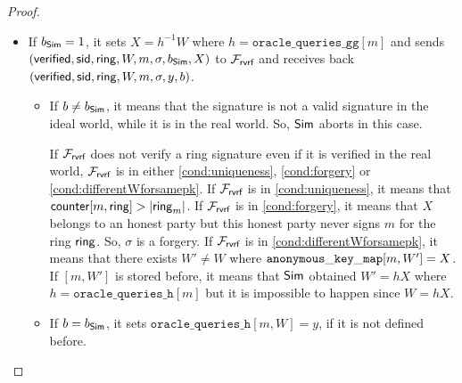 \begin{proof}
\begin{itemize}
		\begin{itemize}
			\item 		If $ b_{\mathsf{Sim}} = 1 $, it sets $ X = h^{-1} W$ where $ h = \mathtt{oracle\_queries\_gg}[m] $ and sends  $ (\mathsf{verified}, \textsf{sid}, \mathsf{ring}, W, m, \sigma, b_{\mathsf{Sim}}, X) $ to $ \mathcal{F}_{\textsf{rvrf}} $ and receives back $ (\mathsf{verified}, \textsf{sid}, \mathsf{ring}, W, m, \sigma, y, b) $. 
			\begin{itemize}
				\item If $ b \neq b_{\mathsf{Sim}} $, it means that the signature is not a valid signature in the ideal world, while it is in the real world. So, $ \mathsf{Sim} $ aborts in this case.
				
				If $ \mathcal{F}_{\textsf{rvrf}} $ does not verify a ring signature even if  it is verified in the real world, $ \mathcal{F}_{\textsf{rvrf}} $ is in either \ref{cond:uniqueness}, \ref{cond:forgery} or \ref{cond:differentWforsamepk}.
				If $ \mathcal{F}_{\textsf{rvrf}} $ is in \ref{cond:uniqueness}, it means that $ \mathsf{counter}[m,\mathsf{ring}] > |\mathsf{ring}_m| $. If $ \mathcal{F}_{\textsf{rvrf}} $ is in \ref{cond:forgery}, it means that $ X $ belongs to an honest party but this honest party never signs $ m $ for the ring $ \mathsf{ring} $. So, $ \sigma $ is a forgery.	 If $ \mathcal{F}_{\textsf{rvrf}} $ is in \ref{cond:differentWforsamepk}, it means that there exists $ W' \neq W $ where $ \mathtt{anonymous\_key\_map}[m,W'] = X $. If $ [m,W'] $ is stored before, it means that $ \mathsf{Sim} $ obtained $ W' = hX $ where $ h = \mathtt{oracle\_queries\_h}[m] $ but it is impossible to happen since $ W = hX $.
				\item If $ b = b_{\mathsf{Sim}} $, it sets $ \mathtt{oracle\_queries\_h}[m,W] = y $, if it is not defined before.
				

\end{itemize}
\end{itemize}
\end{itemize}
\end{proof}
